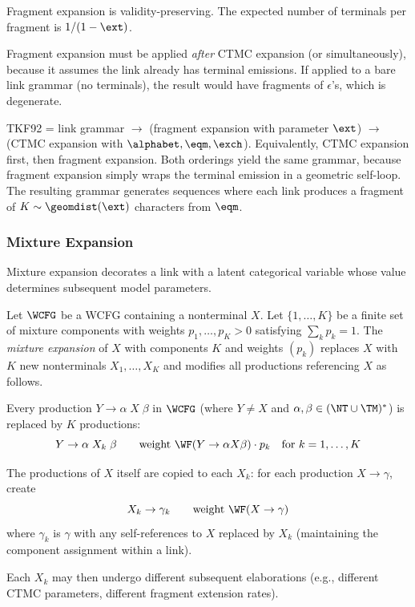 \begin{proposition}
Fragment expansion is validity-preserving.
The expected number of terminals per fragment is $1/(1-\ext)$.
\end{proposition}

\begin{remark}
Fragment expansion must be applied \emph{after} CTMC expansion
(or simultaneously), because it assumes the link already has
terminal emissions.  If applied to a bare link grammar (no terminals),
the result would have fragments of $\epsilon$'s, which is degenerate.
\end{remark}

\begin{example}[TKF92]
TKF92 = link grammar $\to$ (fragment expansion with parameter $\ext$)
$\to$ (CTMC expansion with $\alphabet, \eqm, \exch$).
Equivalently, CTMC expansion first, then fragment expansion.
Both orderings yield the same grammar, because fragment expansion
simply wraps the terminal emission in a geometric self-loop.
The resulting grammar generates sequences where each link produces
a fragment of $K \sim \geomdist(\ext)$ characters from $\eqm$.
\end{example}

\subsubsection{Mixture Expansion}
\label{sec:mixture-appendix}

Mixture expansion decorates a link with a latent categorical variable
whose value determines subsequent model parameters.

\begin{definition}
\label{def:mixture-appendix}
Let $\WCFG$ be a WCFG containing a nonterminal $X$.
Let $\{1, \ldots, K\}$ be a finite set of mixture components
with weights $p_1, \ldots, p_K > 0$ satisfying $\sum_k p_k = 1$.
The \emph{mixture expansion} of $X$ with components $K$
and weights $(p_k)$ replaces $X$ with $K$ new nonterminals
$X_1, \ldots, X_K$ and modifies all productions referencing $X$
as follows.

Every production $Y \to \alpha\;X\;\beta$ in $\WCFG$
(where $Y \neq X$ and $\alpha, \beta \in (\NT \cup \TM)^*$)
is replaced by $K$ productions:
\begin{equation}
Y \to \alpha\;X_k\;\beta \qquad \text{weight } \WF(Y \to \alpha X \beta) \cdot p_k
\quad \text{for } k = 1, \ldots, K
\end{equation}

The productions of $X$ itself are copied to each $X_k$:
for each production $X \to \gamma$, create
\begin{equation}
X_k \to \gamma_k \qquad \text{weight } \WF(X \to \gamma)
\end{equation}
where $\gamma_k$ is $\gamma$ with any self-references to $X$ replaced
by $X_k$ (maintaining the component assignment within a link).

Each $X_k$ may then undergo different subsequent elaborations
(e.g., different CTMC parameters, different fragment extension rates).
\end{definition}

